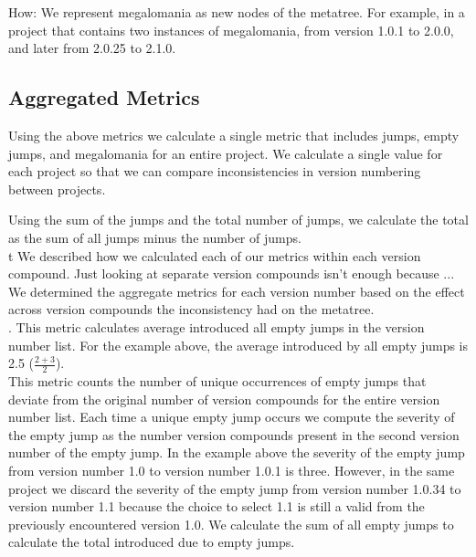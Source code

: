 \documentclass[conference]{IEEEtran}
\begin{document}
How: 
We represent megalomania as new nodes of the metatree.
For example, in a project that contains two instances of megalomania, from version 1.0.1 to 2.0.0, and later from 2.0.25 to 2.1.0.

\subsection{Aggregated Metrics}

Using the above metrics we calculate a single metric that includes jumps, empty jumps, and megalomania for an entire project. 
We calculate a single value for each project so that we can compare inconsistencies in version numbering between projects.

Using the sum of the jumps and the total number of jumps, we calculate the total \numberichoices as the sum of all jumps minus the number of jumps.\\
t
We described how we calculated each of our metrics within each version compound. 
Just looking at separate version compounds isn't enough because ...
We determined the aggregate metrics for each version number based on the effect across version compounds the inconsistency had on the metatree. \\


. 
This metric calculates average \numberchoices introduced all empty jumps in the version number list. For the example above, the average \numberchoices introduced by all empty jumps is 2.5 ($\frac{ 2 + 3}{2}$).
 \\


This metric counts the number of unique occurrences of empty jumps that deviate from the original number of version compounds for the entire version number list. 
Each time a unique empty jump occurs we compute the severity of the empty jump as the number version compounds present in the second version number of the empty jump.
In the example above the severity of the empty jump from version number 1.0 to version number 1.0.1 is three.
However, in the same project we discard the severity of the empty jump from version number 1.0.34 to version number 1.1 because the choice to select 1.1 is still a valid \choice from the previously encountered version 1.0.
We calculate the sum of all empty jumps to calculate the total \numberchoices introduced due to empty jumps. 
\\
\end{document}
